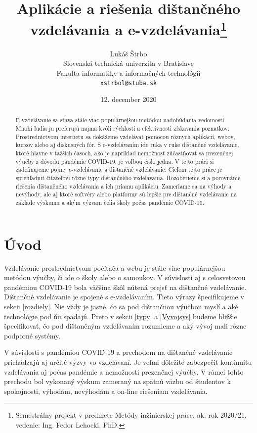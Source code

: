 \documentclass[10pt,oneside,slovak,a4paper]{article}
\title{Aplikácie a riešenia dištančného vzdelávania a e-vzdelávania\thanks{Semestrálny projekt v predmete Metódy inžinierskej práce, ak. rok 2020/21, vedenie: Ing. Fedor Lehocki, PhD.}}
\author{Lukáš Štrbo\\[2pt]
	{\small Slovenská technická univerzita v Bratislave}\\
	{\small Fakulta informatiky a informačných technológií}\\
	{\small \texttt{xstrbol@stuba.sk}}
	}
\date{\small 12. december 2020}
\begin{document}
\maketitle

\begin{abstract}
E-vzdelávanie sa stáva stále viac populárnejšou metódou nadobúdania vedomostí. Mnohí ľudia ju preferujú najmä kvôli rýchlosti a efektívnosti získavania poznatkov.
Prostredníctvom internetu sa dokážeme vzdelávať pomocou rôznych aplikácií, webov, kurzov alebo aj diskusných fór.
S e-vzdelávaním ide ruka v ruke dištančné vzdelávanie, ktoré hlavne v ťažších časoch, ako je napríklad nemožnosť zúčastňovať sa prezenčnej výučby z dôvodu pandémie COVID-19, 
 je voľbou číslo jedna. V tejto práci si zadefinujeme pojmy e-vzdelávanie a dištančné vzdelávanie. Cieľom tejto práce je sprehľadniť čitateľovi rôzne typy dištančného vzdelávania. Rozoberieme si a porovnáme riešenia dištančného vzdelávania a ich priamu
 aplikáciu. Zameriame sa na výhody a nevýhody, ale aj ktoré softvéry alebo platformy sú lepšie pre dištančné vzdelávanie na základe výskumu a akým výzvam čelia školy počas pandémie COVID-19.
\end{abstract}


\section*{Úvod} %
\label{uvod}
Vzdelávanie prostredníctvom počítača a webu je stále viac populárnejšou metódou výučby, či ide o školy alebo o samoukov. V súvislosti aj s celosvetovou pandémiou 
COVID-19 bola väčšina škôl nútená prejsť na dištančné vzdelávanie. Dištančné vzdelávanie je spojené s e-vzdelávaním. Tieto výrazy špecifikujeme v sekcii \ref{rozdiely}.  
Nie vždy je jasné, čo sa pod dištančnou výučbou myslí a aké technológie pod ňu spadajú. Preto v sekcii \ref{typy} a \ref{Vyvojsys} budeme bližšie špecifikovať, čo
pod dištančným vzdelávaním rozumieme a aký vývoj mali rôzne podporné systémy.
 
V súvislosti s pandémiou COVID-19 a prechodom na dištančné vzdelávanie prichádzajú aj určité výzvy vo vzdelávaní.
Je veľmi dôležité zabezpečiť kontinuitu vzdelávania aj počas pandémie a nemožnosti prezenčnej výučby.
V rámci tohto prechodu bol vykonaný výskum zameraný na spätnú väzbu od študentov k spokojnosti, výhodám, nevýhodám a on-line riešeniam vzdelávania.
\end{document}
